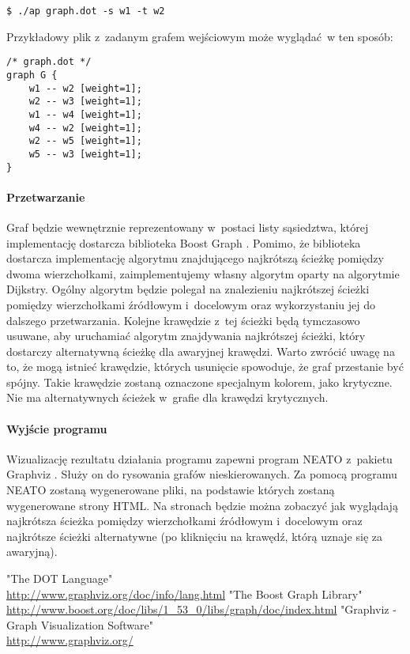 \documentclass[a4paper, 12pt]{article}
\begin{document}
\begin{verbatim}
$ ./ap graph.dot -s w1 -t w2
\end{verbatim}

Przykładowy plik z~zadanym grafem wejściowym może wyglądać~w ten sposób:
\begin{verbatim}
/* graph.dot */
graph G {
	w1 -- w2 [weight=1];
	w2 -- w3 [weight=1];
	w1 -- w4 [weight=1];
	w4 -- w2 [weight=1];
	w2 -- w5 [weight=1];
	w5 -- w3 [weight=1];
}
\end{verbatim}

\paragraph{Przetwarzanie}
Graf będzie wewnętrznie reprezentowany w~postaci listy sąsiedztwa, której implementację dostarcza biblioteka Boost Graph \cite{bgl}. Pomimo, że biblioteka dostarcza implementację algorytmu znajdującego najkrótszą ścieżkę pomiędzy dwoma wierzchołkami, zaimplementujemy własny algorytm oparty na algorytmie Dijkstry. Ogólny algorytm będzie polegał na znalezieniu najkrótszej ścieżki pomiędzy wierzchołkami źródłowym i~docelowym oraz wykorzystaniu jej do dalszego przetwarzania. Kolejne krawędzie z~tej ścieżki będą tymczasowo usuwane, aby uruchamiać algorytm znajdywania najkrótszej ścieżki, który dostarczy alternatywną ścieżkę dla awaryjnej krawędzi. Warto zwrócić uwagę na to, że mogą istnieć krawędzie, których usunięcie spowoduje, że graf przestanie być spójny. Takie krawędzie zostaną oznaczone specjalnym kolorem, jako krytyczne. Nie ma alternatywnych ścieżek w~grafie dla krawędzi krytycznych.

\paragraph{Wyjście programu}
Wizualizację rezultatu działania programu zapewni program NEATO z~pakietu Graphviz \cite{gv}. Służy on do rysowania grafów nieskierowanych. Za pomocą programu NEATO zostaną wygenerowane pliki, na podstawie których zostaną wygenerowane strony HTML. Na stronach będzie można zobaczyć jak wyglądają najkrótsza ścieżka pomiędzy wierzchołkami źródłowym i~docelowym oraz najkrótsze ścieżki alternatywne (po kliknięciu na krawędź, którą uznaje się za awaryjną).

\begin{thebibliography}{}
 "The DOT Language" \\ \url{http://www.graphviz.org/doc/info/lang.html}
 "The Boost Graph Library" \\ \url{http://www.boost.org/doc/libs/1_53_0/libs/graph/doc/index.html}
 "Graphviz - Graph Visualization Software" \\ \url{http://www.graphviz.org/}
\end{thebibliography}
\end{document}
